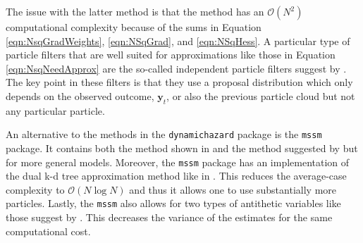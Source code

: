 \documentclass[notitlepage]{article}
\renewcommand{\vec}[1]{\bm{#1}}
\newcommand{\Lparen}[1]{\left( #1\right)}
\newcommand{\bigO}[1]{\mathcal{O}\Lparen{#1}}
\newcommand{\nPart}{N}
\begin{document}
The issue with the latter method is that the method has an $\bigO{\nPart^2}$ 
computational complexity because of the sums in Equation \eqref{eqn:NsqGradWeights}, 
\eqref{eqn:NSqGrad}, and \eqref{eqn:NSqHess}. A particular type of particle filters
that are well suited for approximations like those in Equation \eqref{eqn:NsqNeedApprox}
are the so-called independent particle filters
suggest by \cite{Lin05}. The key point in these filters is that they 
use a proposal distribution 
which only depends on the observed outcome, $\vec y_t$, or also the previous particle 
cloud but not any particular particle. 

An alternative to the methods in the \texttt{dynamichazard} package is the \texttt{mssm} package. It contains 
both the method shown in \cite{cappe05} and the method suggested by \cite{poyiadjis11} but for more general 
models. Moreover, the \texttt{mssm} package has an implementation of the dual k-d tree approximation method like in 
\cite{klaas06}. This reduces the average-case complexity to $\bigO{\nPart\log\nPart}$ and 
thus it allows one 
to use substantially more particles. Lastly, the \texttt{mssm} also allows for two types of 
antithetic variables like those suggest by \cite{Durbin97}. 
This decreases the variance of the estimates for the same computational cost.


\newpage


\end{document}
